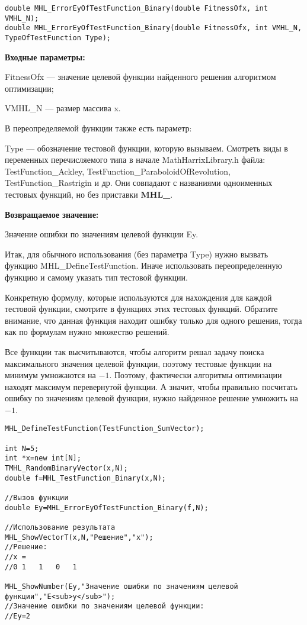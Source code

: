 \documentclass[a4paper,12pt]{article}
\begin{document}
\begin{lstlisting}[label=code_syntax_MHL_ErrorEyOfTestFunction_Binary,caption=Синтаксис]
double MHL_ErrorEyOfTestFunction_Binary(double FitnessOfx, int VMHL_N);
double MHL_ErrorEyOfTestFunction_Binary(double FitnessOfx, int VMHL_N, TypeOfTestFunction Type);
\end{lstlisting}

\textbf{Входные параметры:}

FitnessOfx --- значение целевой функции найденного решения алгоритмом оптимизации;

VMHL\_N --- размер массива x.

В переопределяемой функции также есть параметр:
  
Type --- обозначение тестовой функции, которую вызываем.
Смотреть виды в переменных перечисляемого типа в начале MathHarrixLibrary.h файла: TestFunction\_Ackley, TestFunction\_ParaboloidOfRevolution, TestFunction\_Rastrigin и др. Они совпадают с названиями одноименных тестовых функций, но без приставки \textbf{MHL\_}.

\textbf{Возвращаемое значение:}
 
Значение ошибки по значениям целевой функции Ey.

Итак, для обычного использования (без параметра Type) нужно вызвать функцию MHL\_DefineTestFunction. Иначе использовать переопределенную функцию и самому указать тип тестовой функции.

Конкретную формулу, которые используются для нахождения для каждой тестовой функции, смотрите в функциях этих тестовых функций. Обратите внимание, что данная функция находит ошибку только для одного решения, тогда как по формулам нужно множество решений.

Все функции так высчитываются, чтобы алгоритм решал задачу поиска максимального значения целевой функции, поэтому тестовые функции на минимум умножаются на $-1$. Поэтому, фактически алгоритмы оптимизации находят максимум перевернутой функции. А значит, чтобы правильно посчитать ошибку по значениям целевой функции, нужно найденное решение умножить на $-1$.


\begin{lstlisting}[label=code_use_MHL_ErrorEyOfTestFunction_Binary,caption=Пример использования]
MHL_DefineTestFunction(TestFunction_SumVector);

int N=5;
int *x=new int[N];
TMHL_RandomBinaryVector(x,N);
double f=MHL_TestFunction_Binary(x,N);

//Вызов функции
double Ey=MHL_ErrorEyOfTestFunction_Binary(f,N);

//Использование результата
MHL_ShowVectorT(x,N,"Решение","x");
//Решение:
//x =	
//0	1	1	0	1

MHL_ShowNumber(Ey,"Значение ошибки по значениям целевой функции","E<sub>y</sub>");
//Значение ошибки по значениям целевой функции:
//Ey=2
\end{lstlisting}
\end{document}

